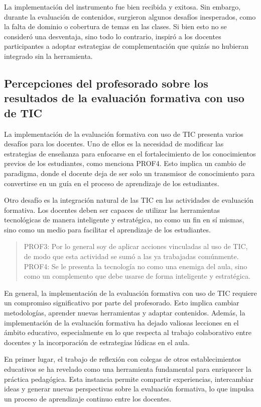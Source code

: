 \documentclass[spanish]{textolivre}
\begin{document}
La implementación del instrumento fue bien recibida y exitosa. Sin embargo, durante la evaluación de contenidos, surgieron algunos desafíos inesperados, como la falta de dominio o cobertura de temas en las clases. Si bien esto no se consideró una desventaja, sino todo lo contrario, inspiró a los docentes participantes a adoptar estrategias de complementación que quizás no hubieran integrado sin la herramienta. 

\subsection{Percepciones del profesorado sobre los resultados de la evaluación formativa con uso de TIC}
La implementación de la evaluación formativa con uso de TIC presenta varios desafíos para los docentes. Uno de ellos es la necesidad de modificar las estrategias de enseñanza para enfocarse en el fortalecimiento de los conocimientos previos de los estudiantes, como menciona PROF4. Esto implica un cambio de paradigma, donde el docente deja de ser solo un transmisor de conocimiento para convertirse en un guía en el proceso de aprendizaje de los estudiantes.

Otro desafío es la integración natural de las TIC en las actividades de evaluación formativa. Los docentes deben ser capaces de utilizar las herramientas tecnológicas de manera inteligente y estratégica, no como un fin en sí mismas, sino como un medio para facilitar el aprendizaje de los estudiantes.

\begin{quote}
    PROF3: Por lo general soy de aplicar acciones vinculadas al uso de TIC, de modo que esta actividad se sumó a las ya trabajadas comúnmente.
\bigskip
\newline
PROF4: Se le presenta la tecnología no como una enemiga del aula, sino como un complemento que debe usarse de forma inteligente y estratégica.
\end{quote}

En general, la implementación de la evaluación formativa con uso de TIC requiere un compromiso significativo por parte del profesorado. Esto implica cambiar metodologías, aprender nuevas herramientas y adaptar contenidos. Además, la implementación de la evaluación formativa ha dejado valiosas lecciones en el ámbito educativo, especialmente en lo que respecta al trabajo colaborativo entre docentes y la incorporación de estrategias lúdicas en el aula.

En primer lugar, el trabajo de reflexión con colegas de otros establecimientos educativos se ha revelado como una herramienta fundamental para enriquecer la práctica pedagógica. Esta instancia permite compartir experiencias, intercambiar ideas y generar nuevas perspectivas sobre la evaluación formativa, lo que impulsa un proceso de aprendizaje continuo entre los docentes.
\end{document}
